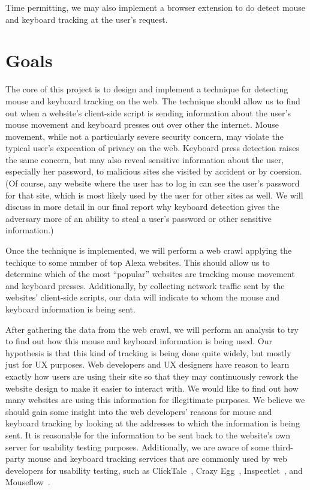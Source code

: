 \documentclass[letterpaper,twocolumn,10pt]{article}
\begin{document}
Time permitting, we may also implement a browser extension to do detect mouse and keyboard tracking at the user's request.

\section{Goals}
The core of this project is to design and implement a technique for detecting mouse and keyboard tracking on the web. The technique should allow us to find out when a website's client-side script is sending information about the user's mouse movement and keyboard presses out over other the internet. Mouse movement, while not a particularly severe security concern, may violate the typical user's expecation of privacy on the web. Keyboard press detection raises the same concern, but may also reveal sensitive information about the user, especially her password, to malicious sites she visited by accident or by coersion. (Of course, any website where the user has to log in can see the user's password for that site, which is most likely used by the user for other sites as well. We will discuss in more detail in our final report why keyboard detection gives the adversary more of an ability to steal a user's password or other sensitive information.)

Once the technique is implemented, we will perform a web crawl applying the techique to some number of top Alexa websites. This should allow us to determine which of the most ``popular'' websites are tracking mouse movement and keyboard presses. Additionally, by collecting network traffic sent by the websites' client-side scripts, our data will indicate to whom the mouse and keyboard information is being sent.

After gathering the data from the web crawl, we will perform an analysis to try to find out how this mouse and keyboard information is being used. Our hypothesis is that this kind of tracking is being done quite widely, but mostly just for UX purposes. Web developers and UX designers have reason to learn exactly how users are using their site so that they may continuously rework the website design to make it easier to interact with. We would like to find out how many websites are using this information for illegitimate purposes. We believe we should gain some insight into the web developers' reasons for mouse and keyboard tracking by looking at the addresses to which the information is being sent. It is reasonable for the information to be sent back to the website's own server for usability testing purposes. Additionally, we are aware of some third-party mouse and keyboard tracking services that are commonly used by web developers for usability testing, such as ClickTale~\cite{clicktale}, Crazy Egg~\cite{crazyegg}, Inspectlet~\cite{inspectlet}, and Mouseflow~\cite{mouseflow}. %
\end{document}
